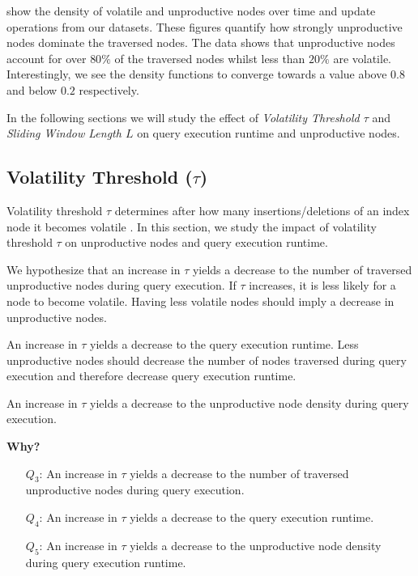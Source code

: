 \documentclass[abstracton,12pt]{scrartcl}
\theoremstyle{definition}
\begin{document}
show the density of volatile and unproductive nodes over time and update
operations from our datasets. These figures quantify how strongly unproductive
nodes dominate the traversed nodes. The data shows that unproductive nodes
account for over $80\%$ of the traversed nodes whilst less than $20\%$ are volatile. 
Interestingly, we see the density functions to converge towards a value above
$0.8$ and below $0.2$ respectively.

In the following sections we will study the effect of \textit{Volatility
  Threshold $\tau$} and \textit{Sliding Window Length $L$} on query execution runtime and
unproductive nodes.

\subsection{Volatility Threshold ($\tau$)}

Volatility threshold $\tau$ determines after how many insertions/deletions of an index node
it becomes volatile \cite{KW17}. In this section, we study the impact of
volatility threshold $\tau$ on unproductive nodes and query execution runtime.

We hypothesize that an increase in $\tau$ yields a decrease to the number of traversed unproductive
nodes during query execution. If $\tau$ increases, it is less likely for a node to become
volatile. Having less volatile nodes should imply a decrease in unproductive nodes.

An increase in $\tau$ yields a decrease to the query execution runtime. Less
unproductive nodes should decrease the number of nodes traversed
during query execution and therefore decrease query execution runtime.

An increase in $\tau$ yields a decrease to the unproductive node density during
query execution.

\textbf{Why?}

\begin{shaded}
  \begin{itemize}
  \item[$Q_3$:] An increase in $\tau$ yields a decrease to the number of
    traversed unproductive nodes during query execution.
  \item[$Q_4$:] An increase in $\tau$ yields a decrease to the query execution runtime. 
  \item[$Q_5$:] An increase in $\tau$ yields a decrease to the unproductive node
    density during query execution runtime.
  \end{itemize}
\end{shaded}
\end{document}
